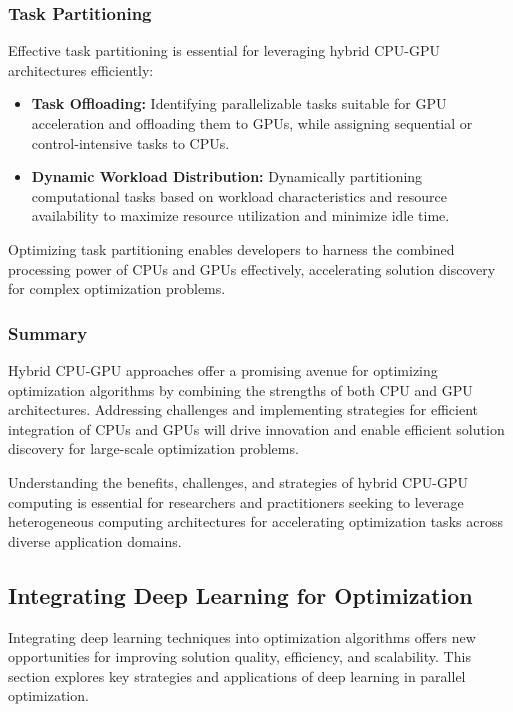 \documentclass[11pt]{report}
\begin{document}
        \subsubsection{Task Partitioning}
        Effective task partitioning is essential for leveraging hybrid CPU-GPU architectures efficiently:
        \begin{itemize}
            \item \textbf{Task Offloading:} Identifying parallelizable tasks suitable for GPU acceleration and offloading them to GPUs, while assigning sequential or control-intensive tasks to CPUs.
        
            \item \textbf{Dynamic Workload Distribution:} Dynamically partitioning computational tasks based on workload characteristics and resource availability to maximize resource utilization and minimize idle time.
        \end{itemize}
        Optimizing task partitioning enables developers to harness the combined processing power of CPUs and GPUs effectively, accelerating solution discovery for complex optimization problems.
        \subsubsection{Summary}
        Hybrid CPU-GPU approaches offer a promising avenue for optimizing optimization algorithms by combining the strengths of both CPU and GPU architectures. Addressing challenges and implementing strategies for efficient integration of CPUs and GPUs will drive innovation and enable efficient solution discovery for large-scale optimization problems.

        Understanding the benefits, challenges, and strategies of hybrid CPU-GPU computing is essential for researchers and practitioners seeking to leverage heterogeneous computing architectures for accelerating optimization tasks across diverse application domains.

        \subsection{Integrating Deep Learning for Optimization}
        Integrating deep learning techniques into optimization algorithms offers new opportunities for improving solution quality, efficiency, and scalability. This section explores key strategies and applications of deep learning in parallel optimization.
\end{document}
